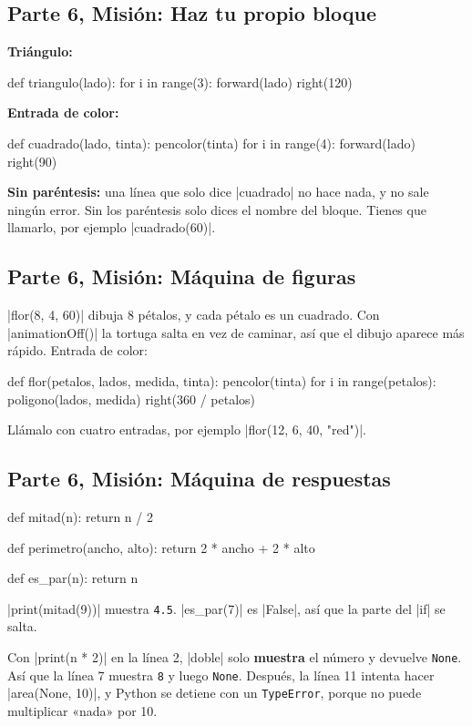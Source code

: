 \subsection*{Parte 6, Misión: Haz tu propio bloque}
\textbf{Triángulo:}
\begin{codenonum}
def triangulo(lado):
    for i in range(3):
        forward(lado)
        right(120)
\end{codenonum}
\textbf{Entrada de color:}
\begin{codenonum}
def cuadrado(lado, tinta):
    pencolor(tinta)
    for i in range(4):
        forward(lado)
        right(90)
\end{codenonum}
\textbf{Sin paréntesis:} una línea que solo dice \py|cuadrado| no hace nada, y no sale ningún error. Sin los paréntesis solo dices el nombre del bloque. Tienes que llamarlo, por ejemplo \py|cuadrado(60)|.

\subsection*{Parte 6, Misión: Máquina de figuras}
\py|flor(8, 4, 60)| dibuja 8 pétalos, y cada pétalo es un cuadrado. Con \py|animationOff()| la tortuga salta en vez de caminar, así que el dibujo aparece más rápido. Entrada de color:
\begin{codenonum}
def flor(petalos, lados, medida, tinta):
    pencolor(tinta)
    for i in range(petalos):
        poligono(lados, medida)
        right(360 / petalos)
\end{codenonum}
Llámalo con cuatro entradas, por ejemplo \py|flor(12, 6, 40, "red")|.

\subsection*{Parte 6, Misión: Máquina de respuestas}
\begin{codenonum}
def mitad(n):
    return n / 2

def perimetro(ancho, alto):
    return 2 * ancho + 2 * alto

def es_par(n):
    return n %
\end{codenonum}
\py|print(mitad(9))| muestra \texttt{4.5}. \py|es_par(7)| es \py|False|, así que la parte del \py|if| se salta.

Con \py|print(n * 2)| en la línea 2, \py|doble| solo \textbf{muestra} el número y devuelve \texttt{None}. Así que la línea 7 muestra \texttt{8} y luego \texttt{None}. Después, la línea 11 intenta hacer \py|area(None, 10)|, y Python se detiene con un \texttt{TypeError}, porque no puede multiplicar «nada» por 10.

